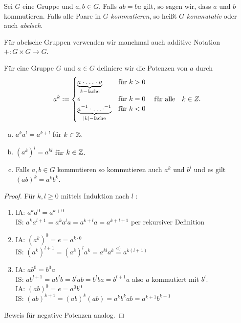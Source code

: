 \begin{definition}
	Sei $G$ eine Gruppe und $a,b \in G$. Falls $ab = ba$ gilt, so sagen wir, dass $a$ und $b$ kommutieren.
	Falls alle Paare in $G$ \emph{kommutieren}, so heißt $G$ \emph{kommutativ} oder auch \emph{abelsch}.
\end{definition}

\begin{remark}
	Für abelsche Gruppen verwenden wir manchmal auch additive Notation $+ : G \times G \to G$.
\end{remark}

\begin{definition}
	Für eine Gruppe $G$ und $a \in G$ definiere wir die Potenzen von $a$ durch
	\[
	a^{k} := \begin{cases}
		\underbrace{a \cdot \ldots \cdot a}_{k-\text{fache}} &\text{für } k > 0\\
		e &\text{für } k=0\\
		\underbrace{a^{-1} \cdot \ldots \cdot ^{-1}}_{\abs{k}-\text{fache}} &\text{für } k < 0
	\end{cases}
	\qq{für alle} k \in Z
	.\] 
\end{definition}

\begin{lemma}[Potenzregel]
	\begin{enumerate}[a)]
		\item $a^{k} a^{l} = a^{k+l}$ für $k \in \mathbb{Z}$.
		\item $(a^{k})^{l} = a^{k l}$ für  $k \in \mathbb{Z}$.
		\item Falls $a,b \in G$ kommutieren so kommutieren auch $a^{k}$ und $b^{l}$ und es gilt $(ab)^{k} = a^{k} b^{k}$.
	\end{enumerate}
\end{lemma}

\begin{proof}
	Für $k,l \geq 0$ mittels Induktion nach $l$ :
	\begin{enumerate}
		\item IA: $a^{k} a^{0} = a^{k+0}$ \\
			IS: $a^{k} a^{l+1} = a^{k} a^{l} a = a^{k+l} a = a^{k+l+1}$ per rekursiver Definition
		\item IA: $(a^{k})^{0} = e = a^{k \cdot 0}$\\
			IS: $(a^{k})^{l+1} = (a^{k})^{l} a^{k} = a^{kl} a^{k} \stackrel{a)}{=} a^{k(l+1)}$ 
		\item IA: $a b^{0} = b^{0} a$ \\
			IS: $a b^{l+1} = a b^{l} b = b^{l} a b = b^{l} b a = b^{l+1} a$ also  $a$ kommutiert mit  $b^{l}$.\\
		IA: $(ab)^{0} = e = a^{0} b^{0}$\\ 
			IS: $(ab)^{k+1} = (ab)^{k} (ab) = a^{k} b^{k} a b = a^{k+1} b^{k+1}$
	\end{enumerate}
	Beweis für negative Potenzen analog.
\end{proof}


